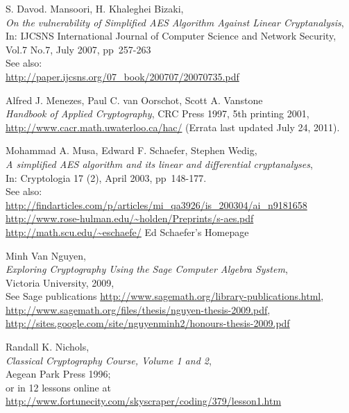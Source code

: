 \begin{thebibliography}{99999}
  
       S. Davod. Mansoori, H. Khaleghei Bizaki, \\
       {\em On the vulnerability of Simplified AES Algorithm Against Linear Cryptanalysis}, \\
       In: IJCSNS International Journal of Computer Science and Network Security, Vol.7 No.7,
           July 2007, pp~257-263 \\
       See also:\\
       \url{http://paper.ijcsns.org/07_book/200707/20070735.pdf}

 
    Alfred J. Menezes, Paul C. van Oorschot, Scott A. Vanstone \\
    {\em Handbook of Applied Cryptography}, 
    CRC Press 1997, 5th printing 2001,\\
    \url{http://www.cacr.math.uwaterloo.ca/hac/} (Errata last updated July 24, 2011).

  
       Mohammad A. Musa, Edward F. Schaefer, Stephen Wedig, \\
       {\em A simplified AES algorithm and its linear and differential cryptanalyses}, \\
       In: Cryptologia 17 (2), April 2003, pp~148-177.\\
       See also:\\
       \url{http://findarticles.com/p/articles/mi_qa3926/is_200304/ai_n9181658}\\
       \url{http://www.rose-hulman.edu/~holden/Preprints/s-aes.pdf}\\
       \url{http://math.scu.edu/~eschaefe/}   Ed Schaefer's Homepage

  
       Minh Van Nguyen, \\
       {\em Exploring Cryptography Using the Sage Computer Algebra System}, \\
       Victoria University, 2009, \\
       See Sage publications \url{http://www.sagemath.org/library-publications.html},\\
       \url{http://www.sagemath.org/files/thesis/nguyen-thesis-2009.pdf},\\
       \url{http://sites.google.com/site/nguyenminh2/honours-thesis-2009.pdf}

  
       Randall K. Nichols, \\
       {\em Classical Cryptography Course, Volume 1 and 2}, \\
       Aegean Park Press 1996;\\
       or in 12 lessons online at \\
       \url{http://www.fortunecity.com/skyscraper/coding/379/lesson1.htm}


\end{thebibliography}
